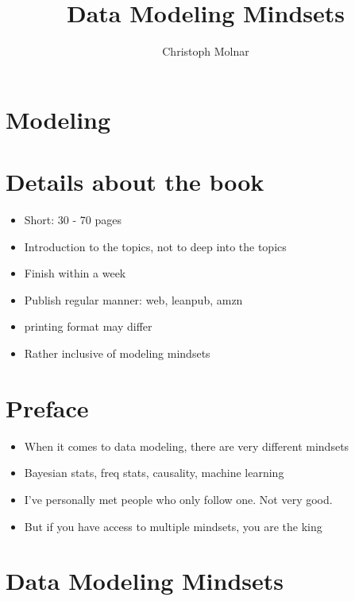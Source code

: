 \documentclass[
  14pt,
]{article}
\title{Data Modeling Mindsets}
\author{Christoph Molnar}
\date{}
\providecommand{\tightlist}{%
  \setlength{\itemsep}{0pt}\setlength{\parskip}{0pt}}
\begin{document}
\maketitle

{
\setcounter{tocdepth}{2}
\tableofcontents
}
\hypertarget{modeling}{%
\section{Modeling}\label{modeling}}

\hypertarget{details-about-the-book}{%
\section{Details about the book}\label{details-about-the-book}}

\begin{itemize}
\tightlist
\item
  Short: 30 - 70 pages
\item
  Introduction to the topics, not to deep into the topics
\item
  Finish within a week
\item
  Publish regular manner: web, leanpub, amzn
\item
  printing format may differ
\item
  Rather inclusive of modeling mindsets
\end{itemize}

\hypertarget{preface}{%
\section{Preface}\label{preface}}

\begin{itemize}
\tightlist
\item
  When it comes to data modeling, there are very different mindsets
\item
  Bayesian stats, freq stats, causality, machine learning
\item
  I've personally met people who only follow one. Not very good.
\item
  But if you have access to multiple mindsets, you are the king
\end{itemize}

\hypertarget{data-modeling-mindsets}{%
\section{Data Modeling Mindsets}\label{data-modeling-mindsets}}
\end{document}
